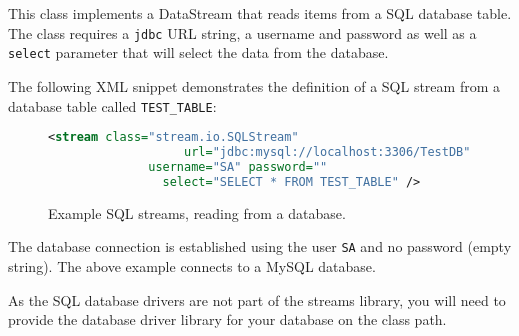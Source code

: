 
This class implements a DataStream that reads items from a SQL database
table. The class requires a \texttt{jdbc} URL string, a username and
password as well as a \texttt{select} parameter that will select the
data from the database.

The following XML snippet demonstrates the definition of a SQL stream
from a database table called \texttt{TEST\_TABLE}:
\begin{figure}[h!]
     \begin{lstlisting}[language=XML]
         <stream class="stream.io.SQLStream"
                   url="jdbc:mysql://localhost:3306/TestDB"
              username="SA" password=""
                select="SELECT * FROM TEST_TABLE" />
     \end{lstlisting}
     \caption{\label{fig:exampleSQLStream}Example SQL streams, reading from a database.}
\end{figure}
The database connection is established using the user \texttt{SA} and no
password (empty string). The above example connects to a MySQL database.

As the SQL database drivers are not part of the streams library, you
will need to provide the database driver library for your database on
the class path.

\begin{table}[h]
\end{table}
